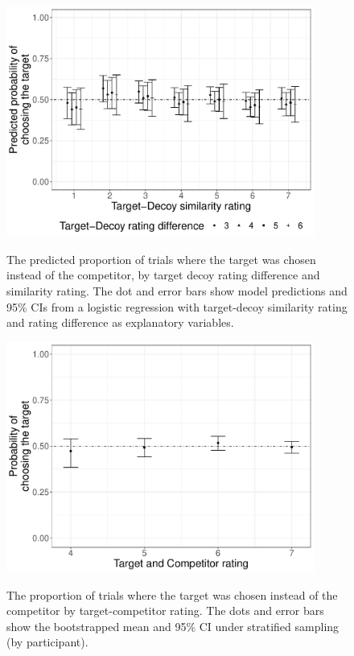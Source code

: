 \documentclass[12pt, a4paper]{article}
\begin{document}
\begin{appendices}
\begin{figure}[htb!]
\centering
		\caption{The predicted proportion of trials where the target was chosen instead of the competitor, by target decoy rating difference and similarity rating. The dot and error bars show model predictions and 95\% CIs from a logistic regression with target-decoy similarity rating and rating difference as explanatory variables.}
\includegraphics[width=0.9\textwidth]{figure6.pdf}
\label{fig:exp2_res_app1}
\end{figure}



\begin{figure}[htb!]
\centering
		\caption{The proportion of trials where the target was chosen instead of the competitor by target-competitor rating. The dots and error bars show the bootstrapped mean and 95\% CI under stratified sampling (by participant).}
\includegraphics[width=0.9\textwidth]{figure7.pdf}
\label{fig:exp2_res_app2}
\end{figure}

\end{appendices}
\end{document}
